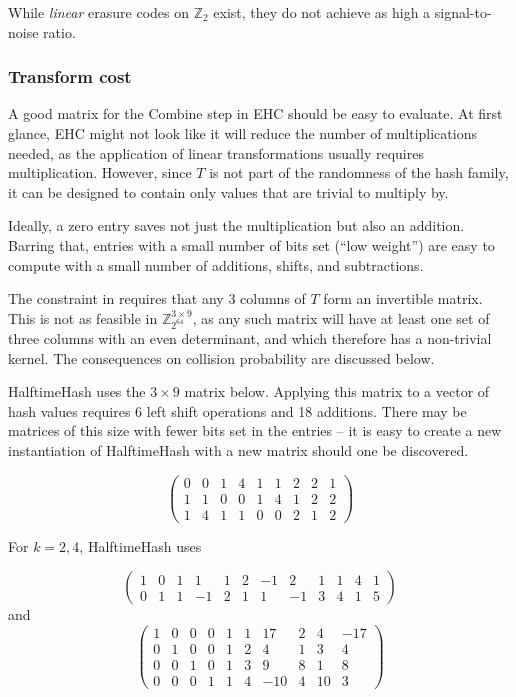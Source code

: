 \documentclass[acmsmall, nonacm]{acmart}
\newcommand{\ints}{\mathbb{Z}}
\begin{document}
While {\em linear} erasure codes on $\ints_2$ exist, they do not achieve as high a signal-to-noise ratio.

\subsubsection{Transform cost}

A good matrix for the Combine step in EHC should be easy to evaluate.
At first glance, EHC might not look like it will reduce the number of multiplications needed, as the application of linear transformations usually requires multiplication.
However, since $T$ is not part of the randomness of the hash family, it can be designed to contain only values that are trivial to multiply by.

Ideally, a zero entry saves not just the multiplication but also an addition.
Barring that, entries with a small number of bits set (``low weight'') are easy to compute with a small number of additions, shifts, and subtractions.

The constraint in \cite{ehc-nandi} requires that any 3 columns of $T$ form an invertible matrix.
This is not as feasible in $\ints_{2^{64}}^{3 \times 9}$, as any such matrix will have at least one set of three columns with an even determinant, and which therefore has a non-trivial kernel.
The consequences on collision probability are discussed below.

HalftimeHash uses the $3 \times 9$ matrix below.
Applying this matrix to a vector of hash values requires 6 left shift operations and 18 additions.
There may be matrices of this size with fewer bits set in the entries -- it is easy to create a new instantiation of HalftimeHash with a new matrix should one be discovered.

\begin{displaymath}
  \left(
\begin{array}{rrrrrrrrr}
  0 & 0 & 1 & 4 & 1 & 1 & 2 & 2 & 1\\
  1 & 1 & 0 & 0 & 1 & 4 & 1 & 2 & 2\\
  1 & 4 & 1 & 1 & 0 & 0 & 2 & 1 & 2
\end{array}
\right)
\end{displaymath}

For $k = 2, 4$, HalftimeHash uses

\[
\left(
\begin{array}{rrrrrrrrrrrr}
  1 & 0 & 1 & 1 & 1 & 2 & -1 & 2 & 1 & 1 & 4 & 1\\
  0 & 1 & 1 & -1 & 2 & 1 & 1 & -1 & 3 & 4 & 1 & 5
\end{array}
\right)
\]
and
\[
\left(
\begin{array}{rrrrrrrrrr}
  1 &  0 &   0&   0&   1&   1&  17&   2&   4& -17 \\
  0  & 1&   0  & 0&   1  & 2&   4  & 1&   3  & 4\\
  0 &  0 &  1 &  0 &  1 &  3 &  9 &  8 &  1 &  8\\
  0&   0  & 0&   1  & 1&   4 &-10&   4  &10&   3
\end{array}
\right)
\]
\end{document}
